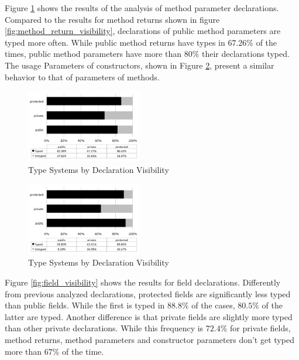 \documentclass[preprint]{sigplanconf}
\begin{document}
Figure \ref{fig:method_parameter_visibility} shows the results of the analysis of method parameter declarations. 
Compared to the results for method returns shown in figure \ref{fig:method_return_visibility}, declarations of public method parameters are typed more often.
While public method returns have types in $67.26\%$ of the times, public method parameters have more than $80\%$ their declarations typed. 
The usage 
Parameters of constructors, shown in Figure \ref{fig:constructor_parameter_visibility}, present a similar behavior to that of parameters of methods.

\begin{figure}[ht]
\centering \includegraphics[width=0.45\textwidth]{images/method_parameter_visibility} 
\caption{Type Systems by Declaration Visibility}
\label{fig:method_parameter_visibility} 
\end{figure}


\begin{figure}[ht]
\centering \includegraphics[width=0.45\textwidth]{images/constructor_parameter_visibility} 
\caption{Type Systems by Declaration Visibility}
\label{fig:constructor_parameter_visibility} 
\end{figure}


Figure \ref{fig:field_visibility} shows the results for field declarations. 
Differently from previous analyzed declarations, protected fields are significantly less typed than public fields. 
While the first is typed in $88.8\%$ of the cases, $80.5\%$ of the latter are typed.
Another difference is that private fields are slightly more typed than other private declarations.
While this frequency is $72.4\%$ for private fields, method returns, method parameters and constructor parameters don't get typed more than $67\%$ of the time.
\end{document}
